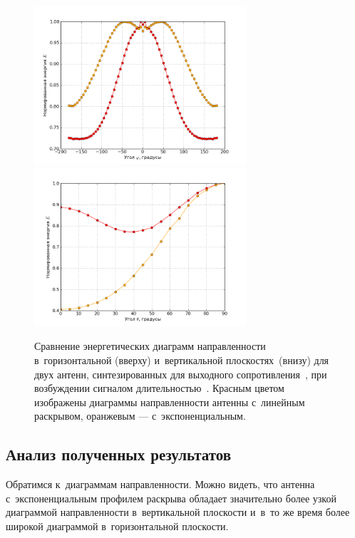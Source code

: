 \begin{figure}[p]
\centering
\includegraphics[width=0.7\textwidth]{graphics/directional-patterns-1000ps-phi}
\includegraphics[width=0.7\textwidth]{graphics/directional-patterns-1000ps-theta}

\caption{
    Сравнение энергетических диаграмм направленности в~горизонтальной (вверху)
    и~вертикальной плоскостях~(внизу) для двух антенн, синтезированных для
    выходного сопротивления~, при возбуждении сигналом
    длительностью~. Красным цветом изображены диаграммы
    направленности антенны с~линейным раскрывом, оранжевым ---
    с~экспоненциальным.}
\label{fig:DirectionalPattern1000ps}
\end{figure}


\subsection{Анализ полученных результатов}

Обратимся к~диаграммам направленности. Можно видеть, что антенна
с~экспоненциальным профилем раскрыва обладает значительно более узкой диаграммой
направленности в~вертикальной плоскости и~в~то же время более широкой диаграммой
в~горизонтальной плоскости.

